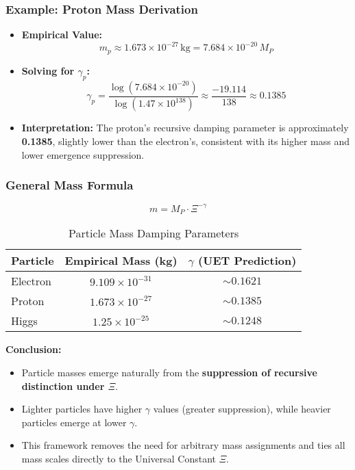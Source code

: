 \documentclass[12pt,a4paper]{article}
\begin{document}
\subsubsection*{Example: Proton Mass Derivation}

\begin{itemize}
    \item \textbf{Empirical Value:} 
    \[
    m_p \approx 1.673 \times 10^{-27} \, \text{kg} = 7.684 \times 10^{-20} \, M_P
    \]

    \item \textbf{Solving for \(\gamma_p\):}
    \[
    \gamma_p = \frac{\log(7.684 \times 10^{-20})}{\log(1.47 \times 10^{138})} \approx \frac{-19.114}{138} \approx 0.1385
    \]

    \item \textbf{Interpretation:}  
    The proton’s recursive damping parameter is approximately \textbf{0.1385}, slightly lower than the electron’s, consistent with its higher mass and lower emergence suppression.
\end{itemize}

\subsubsection*{General Mass Formula}

\[
m = M_P \cdot \Xi^{-\gamma}
\]

\begin{table}[h]
\centering
\begin{tabular}{|l|c|c|}
\hline
\textbf{Particle} & \textbf{Empirical Mass (kg)} & \(\gamma\) \textbf{(UET Prediction)} \\
\hline
Electron & \(9.109 \times 10^{-31}\) & \(\sim 0.1621\) \\
Proton   & \(1.673 \times 10^{-27}\) & \(\sim 0.1385\) \\
Higgs    & \(1.25 \times 10^{-25}\)  & \(\sim 0.1248\) \\
\hline
\end{tabular}
\caption{Particle Mass Damping Parameters}
\end{table}

\textbf{Conclusion:}
\begin{itemize}
    \item Particle masses emerge naturally from the \textbf{suppression of recursive distinction under \(\Xi\)}.
    \item Lighter particles have higher \(\gamma\) values (greater suppression), while heavier particles emerge at lower \(\gamma\).
    \item This framework removes the need for arbitrary mass assignments and ties all mass scales directly to the Universal Constant \(\Xi\).
\end{itemize}
\end{document}
